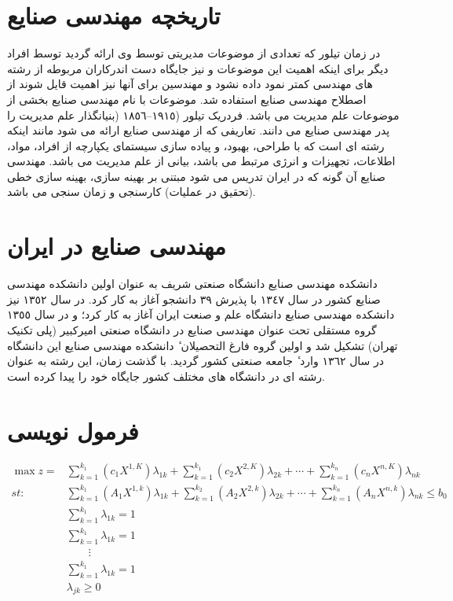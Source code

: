 \documentclass[12pt,onecolumn,a4paper]{article}
\begin{document}
\section{تاریخچه مهندسی صنایع}
در زمان تیلور که تعدادی از موضوعات مدیریتی توسط وی ارائه گردید توسط افراد دیگر برای اینکه اهمیت این موضوعات و نیز جایگاه دست اندرکاران
مربوطه از رشته های مهندسی کمتر نمود داده نشود و مهندسین برای آنها نیز اهمیت قایل شوند از اصطلاح مهندسی صنایع استفاده شد. موضوعات با
نام مهندسی صنایع بخشی از موضوعات علم مدیریت می باشد. فردریک تیلور (١٩١٥–١٨٥٦ (بنیانگذار علم مدیریت را پدر مهندسی صنایع می دانند.
تعاریفی که از مهندسی صنایع ارائه می شود مانند اینکه رشته ای است که با طراحی، بهبود، و پیاده سازی سیستمای یکپارچه از افراد، مواد، اطلاعات،
تجهیزات و انرژی مرتبط می باشد، بیانی از علم مدیریت می باشد. مهندسی صنایع آن گونه که در ایران تدریس می شود مبتنی بر بهینه سازی،
بهینه سازی خطی (تحقیق در عملیات) کارسنجی و زمان سنجی می باشد.





\section{مهندسی صنایع در ایران}
دانشکده مهندسی صنایع دانشگاه صنعتی شریف به عنوان اولین دانشکده مهندسی صنایع کشور در سال ١٣٤٧ با پذیرش ٣٩ دانشجو آغاز به کار کرد.
در سال ١٣٥٢ نیز دانشکده مهندسی صنایع دانشگاه علم و صنعت ایران آغاز به کار کرد؛ و در سال ١٣٥٥ گروه مستقلی تحت عنوان مهندسی صنایع
در دانشگاه صنعتی امیرکبیر (پلی تکنیک تهران) تشکیل شد و اولین گروه فارغ التحصیلان ٔ دانشکده مهندسی صنایع این دانشگاه در سال ١٣٦٢ وارد
ٔ جامعه صنعتی کشور گردید. با گذشت زمان، این رشته به عنوان رشته ای در دانشگاه های مختلف کشور جایگاه خود را پیدا کرده است.










\section{فرمول نویسی}
\begin{align*}
\max z =&\sum_{k=1}^{k_1}(c_{1}X^{1,K})\lambda_{1k}+\sum_{k=1}^{k_1}(c_{2}X^{2,K})\lambda_{2k}+\cdots+\sum_{k=1}^{k_n}(c_{n}X^{n,K})\lambda_{nk} \\
st:\qquad&\sum_{k=1}^{k_1} (A_{1}X^{1,k})\lambda_{1k}+\sum_{k=1}^{k_2}(A_{2}X^{2,k})\lambda_{2k}+\cdots+\sum_{k=1}^{k_n}(A_{n}X^{n,k})\lambda_{nk}\leq b_{0} \\
&\sum_{k=1}^{k_1}\lambda_{1k}=1\\
&\sum_{k=1}^{k_1}\lambda_{1k}=1\\
&\qquad\vdots\\
&\sum_{k=1}^{k_1}\lambda_{1k}=1\\
&\lambda_{jk}\geq 0\\
\end{align*}
\end{document}
